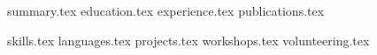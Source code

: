 \documentclass[letterpaper,11pt]{article}
\begin{document}


{summary.tex}
{education.tex}
{experience.tex}
{publications.tex}


\sidebyside
{{skills.tex}}
{{languages.tex}}
{projects.tex}
{workshops.tex}
{volunteering.tex}
\end{document}
